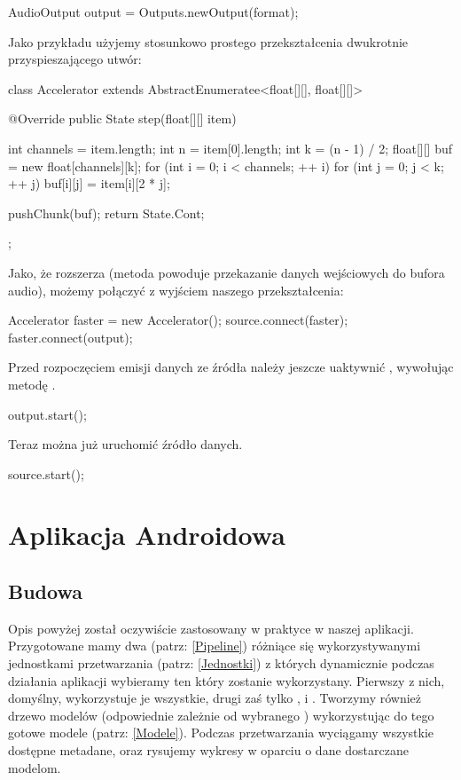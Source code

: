 \begin{java}
AudioOutput output = Outputs.newOutput(format);
\end{java}

Jako przykładu użyjemy stosunkowo prostego przekształcenia dwukrotnie przyspieszającego utwór:

\begin{java}
class Accelerator extends AbstractEnumeratee<float[][], float[][]> {

    @Override
    public State step(float[][] item) {
        int channels = item.length;
        int n = item[0].length;
        int k = (n - 1) / 2;
        float[][] buf = new float[channels][k];
        for (int i = 0; i < channels; ++ i) {
            for (int j = 0; j < k; ++ j) {
                buf[i][j] = item[i][2 * j];
            }
        }

        pushChunk(buf);
        return State.Cont;
    }
};
\end{java}

Jako, że  rozszerza  (metoda  powoduje
przekazanie danych wejściowych do bufora audio), możemy połączyć  z wyjściem naszego
przekształcenia:

\begin{java}
Accelerator faster = new Accelerator();
source.connect(faster);
faster.connect(output);
\end{java}

Przed rozpoczęciem emisji danych ze źródła należy jeszcze uaktywnić , wywołując
metodę .

\begin{java}
output.start();
\end{java}

Teraz można już uruchomić źródło danych.

\begin{java}
source.start();
\end{java}

\chapter{Aplikacja Androidowa}
\section{Budowa}

Opis powyżej został oczywiście zastosowany w praktyce w naszej aplikacji. Przygotowane mamy dwa
 (patrz: \ref{Pipeline}) różniące się wykorzystywanymi jednostkami przetwarzania
(patrz: \ref{Jednostki}) z których dynamicznie podczas działania aplikacji wybieramy ten który
zostanie wykorzystany. Pierwszy z nich, domyślny, wykorzystuje je wszystkie, drugi zaś tylko
,  i . Tworzymy również drzewo modelów (odpowiednie
zależnie od wybranego ) wykorzystując do tego gotowe modele (patrz: \ref{Modele}).
Podczas przetwarzania wyciągamy wszystkie dostępne metadane, oraz rysujemy wykresy w oparciu o dane
dostarczane modelom.  

